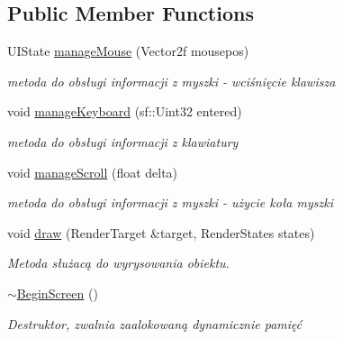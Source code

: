 \subsection*{Public Member Functions}
\begin{DoxyCompactItemize}
\item 
U\+I\+State \mbox{\hyperlink{class_begin_screen_a49b4b67234a8f16d7aa6ba0f0ec982a2}{manage\+Mouse}} (Vector2f mousepos)
\begin{DoxyCompactList}\small\item\em metoda do obsługi informacji z myszki -\/ wciśnięcie klawisza \end{DoxyCompactList}\item 
void \mbox{\hyperlink{class_begin_screen_a7f35b82f9f7ecceb5d45a33298812285}{manage\+Keyboard}} (sf\+::\+Uint32 entered)
\begin{DoxyCompactList}\small\item\em metoda do obsługi informacji z klawiatury \end{DoxyCompactList}\item 
void \mbox{\hyperlink{class_begin_screen_aa105e5520474e8d9eb1f108cf736967b}{manage\+Scroll}} (float delta)
\begin{DoxyCompactList}\small\item\em metoda do obsługi informacji z myszki -\/ użycie koła myszki \end{DoxyCompactList}\item 
void \mbox{\hyperlink{class_begin_screen_a891ea875427d812284dce3ceb83839bc}{draw}} (Render\+Target \&target, Render\+States states)
\begin{DoxyCompactList}\small\item\em Metoda służacą do wyrysowania obiektu. \end{DoxyCompactList}\item 
\mbox{\label{class_begin_screen_aff2dece17ff10fbba21e700add04f047}} 
\mbox{\hyperlink{class_begin_screen_aff2dece17ff10fbba21e700add04f047}{$\sim$\+Begin\+Screen}} ()
\begin{DoxyCompactList}\small\item\em Destruktor, zwalnia zaalokowaną dynamicznie pamięć \end{DoxyCompactList}\end{DoxyCompactItemize}
